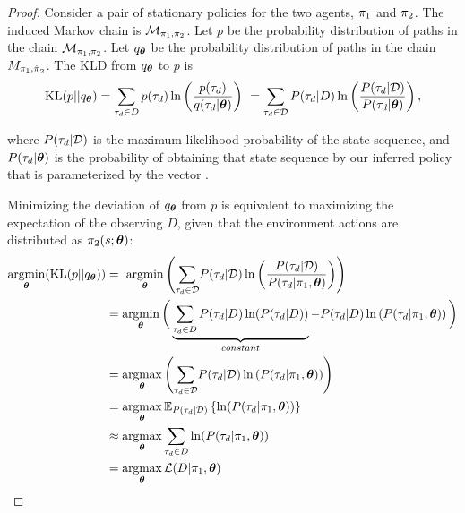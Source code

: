     \begin{proof}
        Consider a pair of stationary policies for the two agents, $\pi_{1}$ and $\pi_{2}$. The induced Markov
        chain is $\mathcal{M}_{\pi_{1}, \pi_{2}}$. Let $p$ be the probability distribution of paths in the chain
        $\mathcal{M}_{\pi_{1}, \pi_{2}}$. Let $q_{\boldsymbol{\mathbb{\theta}}}$ be the probability distribution of paths in the
        chain $M_{\pi_{1}, \hat{\pi_{}}_2}$. The \ac{KLD} from $q_{\boldsymbol{\mathbb{\theta}}}$ to $p$ is
        \begin{equation*}\label{eq:traj_kl_div}
            \text{KL}(p || q_{\boldsymbol{\mathbb{\theta}}}) = \sum_{\tau_d \in D} p(\tau_d) \ln \left( \frac{p(\tau_d)}
                                                {q(\tau_d|\boldsymbol{\mathbb{\theta}})} \right)\
                                          = \sum_{\tau_d \in \mathcal{D}} P(\tau_d|D) \ln \left( \frac{P(\tau_d|\mathcal{D})}
                                                {P(\tau_d|\boldsymbol{\mathbb{\theta}})} \right),
        \end{equation*}

        \noindent
        where $P(\tau_d|\mathcal{D})$ is the maximum likelihood probability of the state sequence, and $P(\tau_d|\boldsymbol{\mathbb{\theta}})$ is
        the probability of obtaining that state sequence by our inferred policy that is parameterized by the vector
        \paramVec.

        Minimizing the deviation of $q_{\boldsymbol{\mathbb{\theta}}}$ from $p$ is equivalent to maximizing the expectation of the
        observing $D$, given that the environment actions are distributed as $\pi_{2}(s; \boldsymbol{\mathbb{\theta}})$:
        \begin{equation}\label{eq:min_kld}
            \begin{aligned}
                \mathop{\mathrm{argmin}}_{\boldsymbol{\mathbb{\theta}}}(\text{KL}(p || q_{\boldsymbol{\mathbb{\theta}}})) & = \
                    \mathop{\mathrm{argmin}}_{\boldsymbol{\mathbb{\theta}}}\left(\sum_{\tau_d \in  \mathcal{D}}\!  P(\tau_d|\mathcal{D})
                    \ln\left(\frac{P(\tau_d|\mathcal{D})}{P(\tau_d|\pi_{1},\boldsymbol{\mathbb{\theta}})}\right)\right)\\
                & = \mathop{\mathrm{argmin}}_{\boldsymbol{\mathbb{\theta}}}\bigg(\underbrace{\sum_{\tau_d \in D} P(\tau_d|D) \ln(P(\tau_d|D))}_{constant} -
                    P(\tau_d|D) \ln\left(P(\tau_d|\pi_{1},\boldsymbol{\mathbb{\theta}})\right)\bigg)\\
                & = \mathop{\mathrm{argmax}}_{\boldsymbol{\mathbb{\theta}}}\left(\sum_{\tau_d \in \mathcal{D}}\!  P(\tau_d|\mathcal{D})
                    \ln\left(P(\tau_d|\pi_{1},\boldsymbol{\mathbb{\theta}})\right)\right)\\
                & = \mathop{\mathrm{argmax}}_{\boldsymbol{\mathbb{\theta}}}\mathbb{E}_{P(\tau_d|\mathcal{D})}\left\{\ln(P(\tau_d|\pi_{1},\boldsymbol{\mathbb{\theta}}))\right\} \\
                &\approx \mathop{\mathrm{argmax}}_{\boldsymbol{\mathbb{\theta}}} \sum_{\tau_d \in D}  \ln(P(\tau_d|\pi_{1},\boldsymbol{\mathbb{\theta}}))\\
                & =\mathop{\mathrm{argmax}}_{\boldsymbol{\mathbb{\theta}}} \mathcal{L}(D|\pi_{1},\boldsymbol{\mathbb{\theta}})
            \end{aligned}
        \end{equation}


\end{proof}

